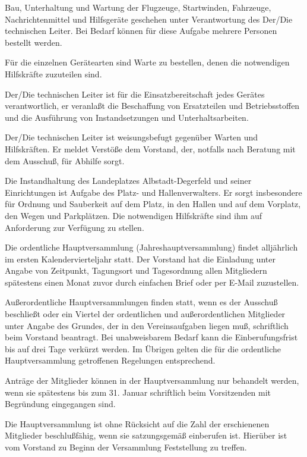 \documentclass[11pt,a4paper,parskip=half]{scrartcl}
\begin{document}
\begin{contract}
\begin{multicols}{2}
		Bau,
    Unterhaltung und Wartung der Flugzeuge,
		Startwinden,
    Fahrzeuge,
    Nachrichtenmittel und Hilfsgeräte geschehen unter Verantwortung des Der/Die technischen Leiter. Bei Bedarf können für diese Aufgabe mehrere Personen bestellt werden.

		Für die einzelnen Gerätearten sind Warte zu bestellen,
    denen die notwendigen Hilfskräfte zuzuteilen sind.

		Der/Die technischen Leiter ist für die Einsatzbereitschaft jedes Gerätes verantwortlich,
		er veranlaßt die Beschaffung von Ersatzteilen und Betriebsstoffen und die Ausführung von Instandsetzungen und Unterhaltsarbeiten.

		Der/Die technischen Leiter ist weisungsbefugt gegenüber Warten und Hilfskräften.
    Er meldet Verstöße dem Vorstand,
    der,
    notfalls nach Beratung mit dem Ausschuß,
    für Abhilfe sorgt.

		Die Instandhaltung des Landeplatzes Albstadt-Degerfeld und seiner Einrichtungen ist Aufgabe des Platz- und Hallenverwalters.
    Er sorgt insbesondere für Ordnung und Sauberkeit auf dem Platz,
    in den Hallen und auf dem Vorplatz,
    den Wegen und Parkplätzen.
    Die notwendigen Hilfskräfte sind ihm auf Anforderung zur Verfügung zu stellen.

		Die ordentliche Hauptversammlung (Jahreshauptversammlung) findet alljährlich im ersten Kalendervierteljahr statt.
    Der Vorstand hat die Einladung unter Angabe von Zeitpunkt,
		Tagungsort und Tagesordnung allen Mitgliedern spätestens einen Monat zuvor durch einfachen Brief oder per E-Mail zuzustellen.

		Außerordentliche Hauptversammlungen finden statt,
    wenn es der Ausschuß beschließt oder ein Viertel der ordentlichen und außerordentlichen Mitglieder unter Angabe des Grundes,
    der in den Vereinsaufgaben liegen muß,
    schriftlich beim Vorstand beantragt.
    Bei unabweisbarem Bedarf kann die Einberufungsfrist bis auf drei Tage verkürzt werden.
		Im Übrigen gelten die für die ordentliche Hauptversammlung getroffenen Regelungen entsprechend.

		Anträge der Mitglieder können in der Hauptversammlung nur behandelt werden,
    wenn sie spätestens bis zum 31. Januar schriftlich beim Vorsitzenden mit Begründung eingegangen sind.

		Die Hauptversammlung ist ohne Rücksicht auf die Zahl der erschienenen Mitglieder beschlußfähig,
    wenn sie satzungsgemäß einberufen ist.
    Hierüber ist vom Vorstand zu Beginn der Versammlung Feststellung zu treffen.


\end{multicols}
\end{contract}
\end{document}
